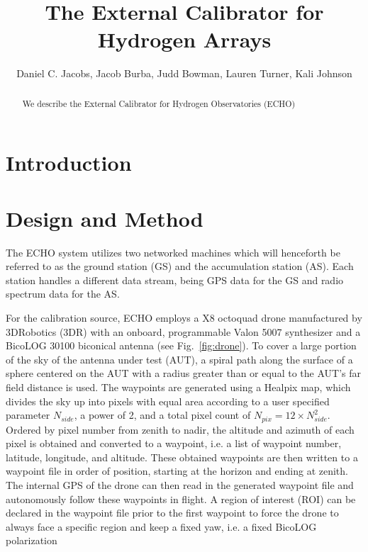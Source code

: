 \documentclass[preprint2]{aastex}
\begin{document}
\title{The External Calibrator for Hydrogen Arrays}
\author{
Daniel C. Jacobs,
Jacob Burba,
Judd Bowman,
Lauren Turner,
Kali Johnson}

\setcounter{footnote}{1}


\begin{abstract}
We describe the External Calibrator for Hydrogen Observatories (ECHO) 
\end{abstract}



\section{Introduction}\label{sec:intro}

\section{Design and Method}

The ECHO system utilizes two networked machines which will henceforth be referred to as the ground station (GS) and the accumulation station (AS).  Each station handles a different data stream, being GPS data for the GS and radio spectrum data for the AS.  %

For the calibration source, ECHO employs a X8 octoquad drone manufactured by 3DRobotics (3DR) with an onboard, programmable Valon 5007 synthesizer and a BicoLOG 30100 biconical antenna (see Fig.~\ref{fig:drone}).  To cover a large portion of the sky of the antenna under test (AUT), a spiral path along the surface of a sphere centered on the AUT with a radius greater than or equal to the AUT's far field distance is used.  The waypoints are generated using a Healpix map, which divides the sky up into pixels with equal area according to a user specified parameter $N_{side}$, a power of 2, and a total pixel count of $N_{pix}=12\times N_{side}^2$.  Ordered by pixel number from zenith to nadir, the altitude and azimuth of each pixel is obtained and converted to a waypoint, i.e. a list of waypoint number, latitude, longitude, and altitude.  These obtained waypoints are then written to a waypoint file in order of position, starting at the horizon and ending at zenith.  The internal GPS of the drone can then read in the generated waypoint file and autonomously follow these waypoints in flight.  A region of interest (ROI) can be declared in the waypoint file prior to the first waypoint to force the drone to always face a specific region and keep a fixed yaw, i.e. a fixed BicoLOG polarization
\end{document}
